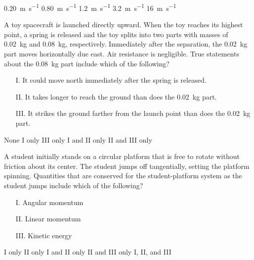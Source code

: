 \documentclass[12pt]{exam}
\begin{document}
\begin{questions}
  \begin{oneparchoices}
    \choice \SI{.20}{\metre\per\second}
    \choice \SI{.80}{\metre\per\second}
    \choice \SI{1.2}{\metre\per\second}
    \choice \SI{3.2}{\metre\per\second}
    \choice \SI{16}{\metre\per\second}
  \end{oneparchoices}
  \vspace{.6in}
  
  \question A toy spacecraft is launched directly upward. When the toy reaches
  its highest point, a spring is released and the toy splits into two parts
  with masses of \SI{.02}{\kilo\gram} and \SI{.08}{\kilo\gram}, respectively.
  Immediately after the separation, the \SI{.02}{\kilo\gram} part moves
  horizontally due east. Air resistance is negligible. True statements about
  the \SI{.08}{\kilo\gram} part include which of the following?
  \begin{enumerate}[nosep]
  \item[I.] It could move north immediately after the spring is released.
  \item[II.] It takes longer to reach the ground than does the
    \SI{.02}{\kilo\gram} part.
  \item[III.] It strikes the ground farther from the launch point than does the
    \SI{.02}{\kilo\gram} part.
  \end{enumerate}
  \begin{oneparchoices}
    \choice None
    \choice I only
    \choice III only
    \choice I and II only
    \choice II and III only
  \end{oneparchoices}
  \vspace{.6in}
  
  \question A student initially stands on a circular platform that is free to
  rotate without friction about its center. The student jumps off tangentially,
  setting the platform spinning. Quantities that are conserved for the
  student-platform system as the student jumps include which of the following?
  \begin{enumerate}[nosep]
  \item[I.] Angular momentum
  \item[II.] Linear momentum
  \item[III.] Kinetic energy
  \end{enumerate}
  \begin{oneparchoices}
    \choice I only
    \choice II only
    \choice I and II only
    \choice II and III only
    \choice I, II, and III
  \end{oneparchoices}
  \vspace{.7in}
  \newpage
  

\end{questions}
\end{document}
